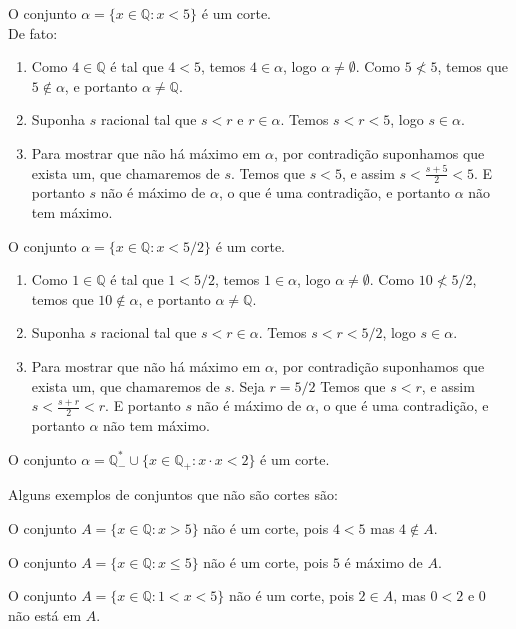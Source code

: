 \documentclass[../main.tex]{subfiles}
\begin{document}
\begin{ex}
    O conjunto $\alpha = \{ x \in \mathbb{Q} : x < 5 \}$ é um corte. \\
    De fato:
    \begin{enumerate}[label=(\roman*)]
        \item Como $4 \in \mathbb{Q}$ é tal que $4 < 5$, temos  $4 \in \alpha$, logo  $ \alpha \neq \emptyset$. Como $5 \not< 5$, temos que $5 \not\in \alpha$, e portanto $\alpha \neq \mathbb{Q}$.
        \item Suponha $s$ racional tal que $s < r$ e $r \in \alpha$. Temos $s < r < 5$, logo $s \in \alpha$.
        \item Para mostrar que não há máximo em $\alpha$, por contradição suponhamos que exista um, que chamaremos de $s$. Temos que $s < 5$, e assim $s < \frac{s+5}{2} < 5$. E portanto $s$ não é máximo de $\alpha$, o que é uma contradição, e portanto $\alpha$ não tem máximo.
    \end{enumerate}
\end{ex}
\begin{ex}
    O conjunto $\alpha = \{ x \in \mathbb{Q} : x < 5/2 \}$ é um corte.
    \begin{enumerate}[label=(\roman*)]
        \item Como $1 \in \mathbb{Q}$ é tal que $1 < 5/2$, temos  $1 \in \alpha$, logo  $ \alpha \neq \emptyset$. Como $10 \not< 5/2$, temos que $10 \not\in \alpha$, e portanto $\alpha \neq \mathbb{Q}$.
        \item Suponha $s$ racional tal que $s < r \in \alpha$. Temos $s < r < 5/2$, logo $s \in \alpha$.
        \item Para mostrar que não há máximo em $\alpha$, por contradição suponhamos que exista um, que chamaremos de $s$. Seja $r = 5/2$ Temos que 
        $s < r$, e assim $s < \frac{s+r}{2} < r$. E portanto $s$ não é máximo de $\alpha$, o que é uma contradição, e portanto $\alpha$ não tem máximo.
    \end{enumerate}
\end{ex}
\begin{ex}
    O conjunto $\alpha =  \mathbb{Q}_{-}^* \cup \{ x \in \mathbb{Q_{+}} : x \cdot x < 2 \} $ é um corte.
\end{ex}

Alguns exemplos de conjuntos que não são cortes são:
\begin{ex}
    O conjunto $A = \{ x \in \mathbb{Q} : x > 5 \}$ não é um corte, pois $4 < 5$ mas $4 \not\in A$.
\end{ex}
\begin{ex}
    O conjunto $A = \{ x \in \mathbb{Q} : x \leq 5 \}$ não é um corte, pois $5$ é máximo de $A$.
\end{ex}
\begin{ex}
    O conjunto $A = \{ x \in \mathbb{Q} : 1 < x < 5 \}$ não é um corte, pois $2 \in A$, mas $0 < 2$ e $0$ não está em $A$.
\end{ex}
\end{document}
